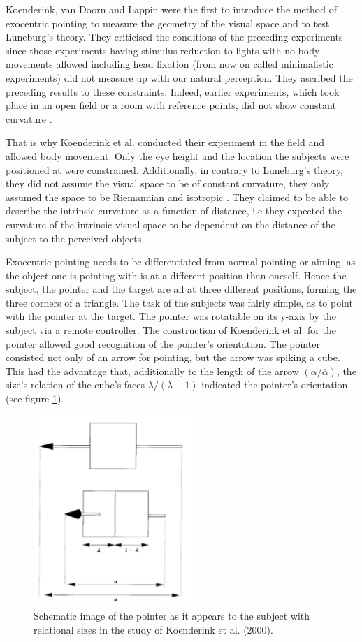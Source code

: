 Koenderink, van Doorn and Lappin \citeyear{Koenderink.2000} were the first to introduce the method of exocentric pointing to measure the geometry of the visual space and to test Luneburg's theory. They criticised the conditions of the pre\-ce\-ding experiments since those experiments having stimulus reduction to lights with no body movements allowed including head fixation (from now on called minimalistic experiments) did not measure up with our natural perception. They ascribed the preceding results to these constraints. Indeed, earlier experiments, which took place in an open field or a room with reference points, did not show constant curvature \cite{Cuijpers.2001, Battro.1976}.

That is why Koenderink et al. conducted their experiment in the field and allowed body movement. Only the eye height and the location the subjects were positioned at were constrained. Additionally, in contrary to Luneburg's theory, they did not assume the visual space to be of constant curvature, they only assumed the space to be Riemannian and isotropic \cite{Koenderink.2000}. They claimed to be able to describe the intrinsic curvature as a function of distance, i.e they expected the curvature of the intrinsic visual space to be dependent on the distance of the subject to the perceived objects. 

Exocentric pointing needs to be differentiated from normal pointing or aiming, as the object one is pointing with is at a different position than oneself. Hence the subject, the pointer and the target are all at three different positions, forming the three corners of a triangle. The task of the subjects was fairly simple, as to point with the pointer at the target. The pointer was rotatable on its y-axis by the subject via a remote controller. The construction of Koenderink et al. \citeyear{Koenderink.2000} for the pointer allowed good recognition of the pointer's orientation. The pointer consisted not only of an arrow for pointing, but the arrow was spiking a cube. This had the advantage that, additionally to the length of the arrow $(\alpha/\bar \alpha)$, the size's relation of the cube's faces $\lambda / (\lambda -1)$ indicated the pointer's orientation (see figure \ref{figSchematicPointer}). 
\begin{figure}
    \centering
    \includegraphics[width=6cm]{Images/PointerSkize.PNG}%
    \caption{Schematic image of the pointer as it appears to the subject with relational sizes in the study of Koenderink et al. (2000).} %
    \label{figSchematicPointer}
\end{figure}

